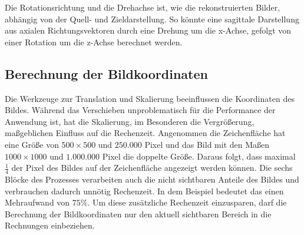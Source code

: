Die Rotationsrichtung und die Drehachse ist, wie die rekonstruierten Bilder, abhängig von der Quell- und Zieldarstellung. So könnte eine sagittale Darstellung aus axialen Richtungsvektoren durch eine Drehung um die x-Achse, gefolgt von einer Rotation um die z-Achse berechnet werden.

\FloatBarrier

\subsection{Berechnung der Bildkoordinaten}
Die Werkzeuge zur Translation und Skalierung beeinflussen die Koordinaten des Bildes. Während das Verschieben unproblematisch für die Performance der Anwendung ist, hat die Skalierung, im Besonderen die Vergrößerung, maßgeblichen Einfluss auf die Rechenzeit. Angenommen die Zeichenfläche hat eine Größe von $500 \times 500$ und $250.000$ Pixel und das Bild mit den Maßen $1000 \times 1000$  und $1.000.000$ Pixel die doppelte Größe. Daraus folgt, dass maximal $\frac{1}{4}$ der Pixel des Bildes auf der Zeichenfläche angezeigt werden können. Die sechs Blöcke des Prozesses verarbeiten auch die nicht sichtbaren Anteile des Bildes und verbrauchen dadurch unnötig Rechenzeit. In dem Beispiel bedeutet das einen Mehraufwand von $75\%$. Um diese zusätzliche Rechenzeit einzusparen, darf die Berechnung der Bildkoordinaten nur den aktuell sichtbaren Bereich in die Rechnungen einbeziehen.\\

